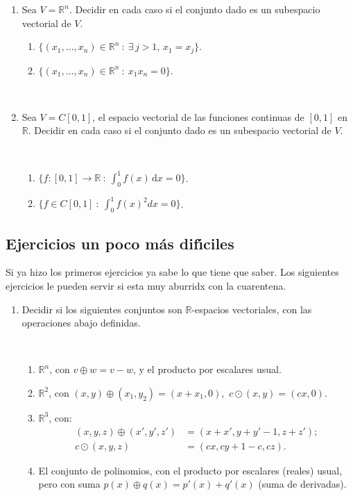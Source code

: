\documentclass[12pt]{amsart}
\begin{document}
\begin{enumerate}[resume]

    \item Sea $V= \mathbb{R}^{n}$. Decidir en cada caso si el conjunto dado es un subespacio vectorial de $V$.
	\begin{enumerate}
		\item $\{(x_1, \ldots ,x_n) \in \mathbb{R}^n \ : \ \exists \, j > 1, \, x_1 = x_j\}$.
		\item $\{(x_1, \ldots , x_n) \in\mathbb{R}^n \ : \ x_1x_n = 0 \}$.
	\end{enumerate}
		

\
	
	\item Sea $V= C[0,1]$, el espacio vectorial de las funciones continuas de $[0,1]$ en $\mathbb{R}$. Decidir en cada caso si el conjunto dado es un subespacio vectorial de $V$.
	
	\
	
	\begin{enumerate}
		\item $\{ f : [0,1] \rightarrow \mathbb{R}\ : \ \int_0^1 f(x)\, \mathrm{d}x = 0\}$.
			\item $\{ f \in C[0,1] \ : \ \int_0^1 f(x)^2 dx = 0\}$.
	\end{enumerate}
\end{enumerate}

\subsection*{Ejercicios un poco m\'as dif\' \i ciles} 

Si ya hizo los primeros ejercicios ya sabe lo que tiene que saber. Los siguientes ejercicios le pueden servir si esta muy aburridx con la cuarentena. 


\begin{enumerate}[resume]
\item Decidir si los siguientes conjuntos son $\mathbb{R}$-espacios vectoriales, con las operaciones abajo definidas.

\

\begin{enumerate}
\item $\mathbb{R}^n$, con $v\oplus w = v - w$, y el producto por escalares usual.
		
\item $\mathbb{R}^2$, con $(x,y)\oplus(x_1,y_2) = (x + x_1, 0), \,\,c\odot(x,y) = (cx,0)$.

\item $\mathbb{R}^{3}$, con:
		\begin{align*}
		(x,y,z)\oplus(x',y',z') &=(x + x', y + y' - 1, z + z');\\
		c\odot(x,y,z) &= (cx,cy + 1 - c, cz).
		\end{align*}
		\item El conjunto de polinomios, con el producto por escalares (reales) usual, pero con suma
		$p(x)\oplus q(x) = p'(x) + q' (x)$ (suma de derivadas).
\end{enumerate}


\end{enumerate}
\end{document}

